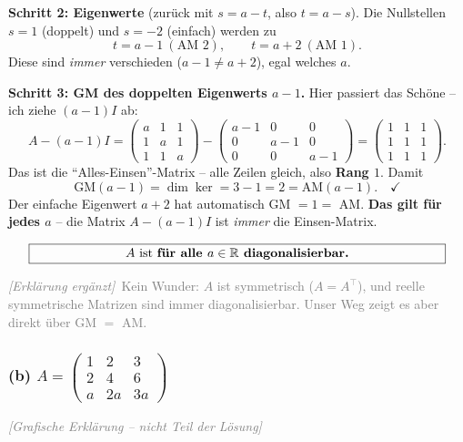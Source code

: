 \documentclass[a4paper,12pt]{article}
\newcommand{\grafik}{\textcolor{gray}{\small\textit{[Grafische Erkl\"arung -- nicht Teil der L\"osung]}}}
\newcommand{\erglerk}{\textcolor{gray}{\small\textit{[Erkl\"arung erg\"anzt]}}}
\begin{document}
\textbf{Schritt 2: Eigenwerte} (zur\"uck mit $s = a - t$, also $t = a - s$). Die Nullstellen $s = 1$ (doppelt) und $s = -2$ (einfach) werden zu
\[
t = a - 1 \ (\text{AM } 2), \qquad t = a + 2 \ (\text{AM } 1).
\]
Diese sind \emph{immer} verschieden ($a - 1 \neq a + 2$), egal welches $a$.

\textbf{Schritt 3: GM des doppelten Eigenwerts $a-1$.} Hier passiert das Sch\"one -- ich ziehe $(a-1)I$ ab:
\[
A - (a-1)I = \begin{pmatrix} a & 1 & 1 \\ 1 & a & 1 \\ 1 & 1 & a \end{pmatrix} - \begin{pmatrix} a-1 & 0 & 0 \\ 0 & a-1 & 0 \\ 0 & 0 & a-1 \end{pmatrix} = \begin{pmatrix} 1 & 1 & 1 \\ 1 & 1 & 1 \\ 1 & 1 & 1 \end{pmatrix}.
\]
Das ist die ``Alles-Einsen''-Matrix -- alle Zeilen gleich, also \textbf{Rang $1$}. Damit
\[
\text{GM}(a-1) = \dim\ker = 3 - 1 = 2 = \text{AM}(a-1). \quad\checkmark
\]
Der einfache Eigenwert $a+2$ hat automatisch GM $= 1 =$ AM. \textbf{Das gilt f\"ur jedes $a$} -- die Matrix $A - (a-1)I$ ist \emph{immer} die Einsen-Matrix.

\[
\fbox{\parbox{0.93\textwidth}{\centering
$A$ ist \textbf{f\"ur alle $a \in \mathbb{R}$ diagonalisierbar.}
}}
\]

\erglerk\ \textcolor{gray}{\small Kein Wunder: $A$ ist symmetrisch ($A = A^\top$), und reelle symmetrische Matrizen sind immer diagonalisierbar. Unser Weg zeigt es aber direkt \"uber GM $=$ AM.}

\subsubsection*{(b) $A = \left(\begin{smallmatrix} 1 & 2 & 3 \\ 2 & 4 & 6 \\ a & 2a & 3a \end{smallmatrix}\right)$}

\grafik
\end{document}
